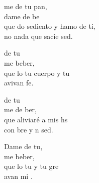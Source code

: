\begin{cancion}%
	me de tu pan,\\
	dame de be\\
	que do sediento y hamo de ti,\\
	no  nada que sacie  sed.\\
	\begin{chorus}%
	de tu \\
	me  beber,\\
	que lo tu cuerpo y tu   \\
	avivan  fe.\\
	\end{chorus}%
	de tu \\
	me de ber,\\
	que  aliviaré a mis hs\\
	con bre y n sed.\\
	\begin{chorus}%
	Dame de tu,\\
	me  beber,\\
	que lo tu  y tu gre\\
	avan mi .\\
	\end{chorus}%
\end{cancion}%
